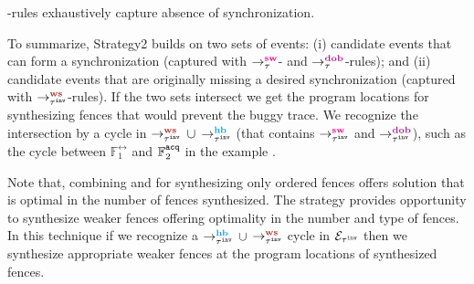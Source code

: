 \begin{theorem} \label{thm:ws exhaustive}
	\lws-rules exhaustively capture absence of synchronization.
\end{theorem}

To summarize, Strategy2 builds on two sets of events:
(i) candidate events that can form a synchronization 
(captured with $\setSW$- and $\setDOB$-rules); and
(ii) candidate events that are originally missing a desired
synchronization (captured with $\setWS$-rules).
If the two sets intersect we get the program locations
for synthesizing fences that would prevent the buggy trace.
We recognize the intersection by a cycle in  
$\ws{\inv{\tau}}{}{}$ $\cup$ $\hb{\inv{\tau}}{}{}$ 
(that contains $\sw{\inv{\tau}}{}{}$ and $\dob{\inv{\tau}}{}{}$), 
such as the cycle between $\mathbb{F}^\rel_1$ and 
$\mathbb{F}^\texttt{acq}_2$ in the example .

Note that, combining \stfence and \wkfence for synthesizing only
\sc ordered fences offers solution that is optimal in the number
of fences synthesized. 
%
The \wkfence strategy provides opportunity to synthesize weaker
fences offering optimality in the number and type of fences.
%
In this technique if we recognize a $\hb{\inv{\tau}}{}{}$ $\cup$ 
$\ws{\inv{\tau}}{}{}$ cycle in $\mathcal{E}_{{\tau}^{\mathtt{inv}}}$ then we
synthesize appropriate weaker fences at the program locations  
of synthesized fences.
